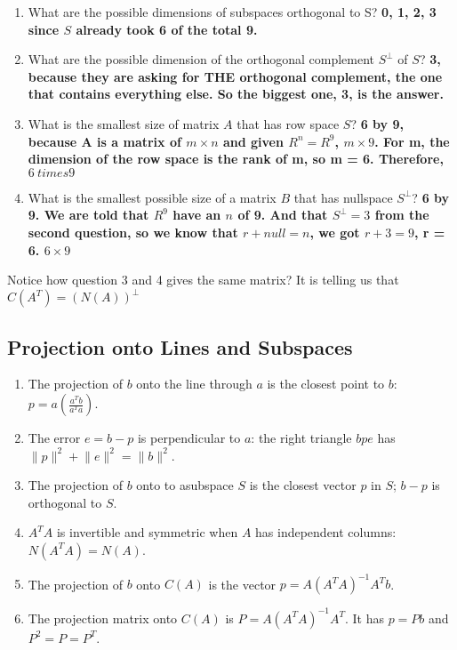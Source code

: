\begin{enumerate}
    \item What are the possible dimensions of subspaces orthogonal to S? \textbf{0, 1, 2, 3 since \(S\) already took 6 of the total 9.}
    \item What are the possible dimension of the orthogonal complement \(S^{\perp}\) of \(S\)? \textbf{3, because they are asking for THE orthogonal complement, the one that contains everything else. So the biggest one, 3, is the answer. }
    \item What is the smallest size of matrix \(A\) that has row space \(S\)? \textbf{6 by 9, because A is a matrix of \(m \times n\) and given  \(R^n = R^9\), \(m \times 9\). For m, the dimension of the row space is the rank of m, so m = 6. Therefore, \(6 \ times 9\)  }
    \item What is the smallest possible size of a matrix \(B\) that has nullspace \(S^{\perp}\)? \textbf{6 by 9. We are told that \(R^9\) have an \(n\) of 9. And that \(S^{\perp} = 3\) from the second question, so we know that \(r + null = n \), we got \(r + 3 = 9\), r = 6. \(6 \times 9\)      }         
\end{enumerate} 

Notice how question 3 and 4 gives the same matrix? It is telling us that \(C(A^T) = (N(A))^{\perp} \) 

\subsection{Projection onto Lines and Subspaces}
\begin{enumerate}
    \item The projection of \(b\) onto the line through \(a\) is the closest point to \(b\): \(p = a(\frac{a^{T}b}{a^{T}a})\). 
    \item The error \(e = b - p\) is perpendicular to \(a\): the right triangle \(b p e\) has \(\lVert p \rVert^2 + \lVert e \rVert^2 = \lVert b \rVert^2   \). 
    \item The projection of \(b\) onto to asubspace \(S\) is the closest vector \(p\) in \(S\); \(b - p\) is orthogonal to \(S\). 
    \item \(A^{T}A\) is invertible and symmetric when \(A\) has independent columns: \(N(A^{T}A)= N(A)\).                 
    \item The projection of \(b\) onto \(C(A)\) is the vector \(p = A(A^{T}A)^{-1}A^{T}b\).
    \item The projection matrix onto \(C(A)\) is \(P = A(A^{T}A)^{-1}A^T\). It has \(p = Pb\) and \(P^2 = P = P^T\).  
\end{enumerate}

